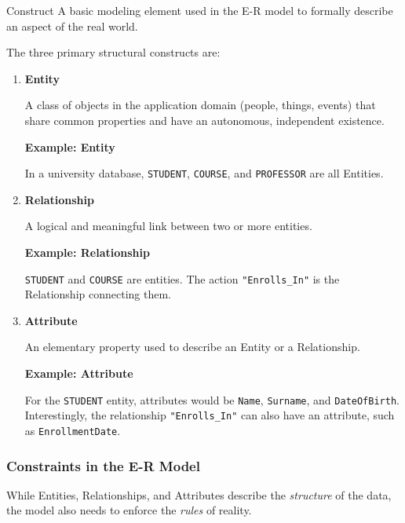 \begin{defbox}{Construct}
A basic modeling element used in the E-R model to formally describe an aspect of the real world.
\end{defbox}

The three primary structural constructs are:

\pagebreak
\begin{enumerate}
\item \textbf{Entity}

A class of objects in the application domain (people, things, events) that share common properties and have an autonomous, independent existence.


\vspace{0.2cm}
\begin{example}{\textbf{Example: Entity}}

In a university database, \texttt{STUDENT}, \texttt{COURSE}, and \texttt{PROFESSOR} are all Entities.
\end{example}

\vs
\item \textbf{Relationship}

A logical and meaningful link between two or more entities.


\vspace{0.2cm}
\begin{example}{\textbf{Example: Relationship}}

\texttt{STUDENT} and \texttt{COURSE} are entities. The action \texttt{"Enrolls\_In"} is the Relationship connecting them.
\end{example}

\vs
\item \textbf{Attribute}

An elementary property used to describe an Entity or a Relationship.

\vspace{0.2cm}
\begin{example}{\textbf{Example: Attribute}}

For the \texttt{STUDENT} entity, attributes would be \texttt{Name}, \texttt{Surname}, and \texttt{DateOfBirth}. \\
Interestingly, the relationship \texttt{"Enrolls\_In"} can also have an attribute, such as \texttt{EnrollmentDate}.
\end{example}
\end{enumerate}


\subsubsection{Constraints in the E-R Model}
While Entities, Relationships, and Attributes describe the \textit{structure} of the data, the model also needs to enforce the \textit{rules} of reality. 

